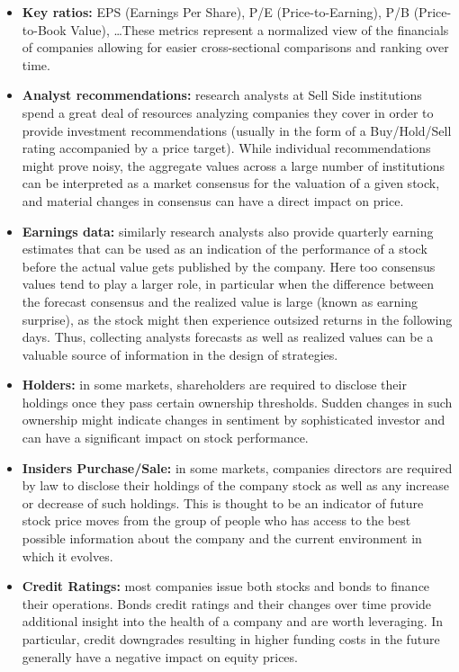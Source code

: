 \begin{itemize}
\item \textbf{Key ratios:} EPS (Earnings Per Share), P/E (Price-to-Earning), P/B (Price-to-Book Value), \dots These metrics represent a normalized view of the financials of companies allowing for easier cross-sectional comparisons and ranking over time.
\item \textbf{Analyst recommendations:} research analysts at Sell Side institutions spend a great deal of resources analyzing companies they cover in order to provide investment recommendations (usually in the form of a Buy/Hold/Sell rating accompanied by a price target). While individual recommendations might prove noisy, the aggregate values across a large number of institutions can be interpreted as a market consensus for the valuation of a given stock, and material changes in consensus can have a direct impact on price.
\item \textbf{Earnings data:} similarly research analysts also provide quarterly earning estimates that can be used as an indication of the performance of a stock before the actual value gets published by the company. Here too consensus values tend to play a larger role, in particular when the difference between the forecast consensus and the realized value is large (known as earning surprise), as the stock might then experience outsized returns in the following days. Thus, collecting analysts forecasts as well as realized values can be a valuable source of information in the design of strategies.
\item \textbf{Holders:}  in some markets, shareholders are required to disclose their holdings once they pass certain ownership thresholds. Sudden changes in such ownership might indicate changes in sentiment by sophisticated investor and can have a significant impact on stock performance.
\item \textbf{Insiders Purchase/Sale:}  in some markets, companies directors are required by law to disclose their holdings of the company stock as well as any increase or decrease of such holdings. This is thought to be an indicator of future stock price moves from the group of people who has access to the best possible information about the company and the current environment in which it evolves.
\item \textbf{Credit Ratings:} most companies issue both stocks and bonds to finance their operations. Bonds credit ratings and their changes over time provide additional insight into the health of a company and are worth leveraging. In particular, credit downgrades resulting in higher funding costs in the future generally have a negative impact on equity prices.

\end{itemize}
